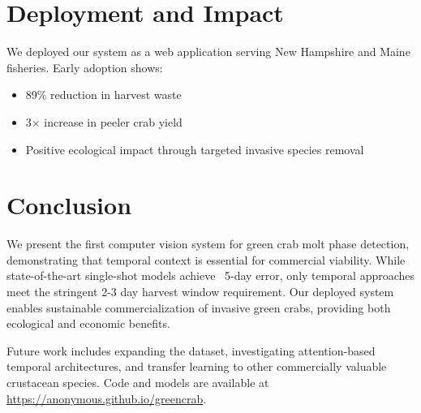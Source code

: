 \documentclass[10pt,twocolumn,letterpaper]{article}
\begin{document}
\section{Deployment and Impact}

We deployed our system as a web application serving New Hampshire and Maine fisheries. Early adoption shows:
\begin{itemize}
\item 89\% reduction in harvest waste
\item 3× increase in peeler crab yield
\item Positive ecological impact through targeted invasive species removal
\end{itemize}

\section{Conclusion}

We present the first computer vision system for green crab molt phase detection, demonstrating that temporal context is essential for commercial viability. While state-of-the-art single-shot models achieve ~5-day error, only temporal approaches meet the stringent 2-3 day harvest window requirement. Our deployed system enables sustainable commercialization of invasive green crabs, providing both ecological and economic benefits.

Future work includes expanding the dataset, investigating attention-based temporal architectures, and transfer learning to other commercially valuable crustacean species. Code and models are available at \url{https://anonymous.github.io/greencrab}.

{\small


}
\end{document}
